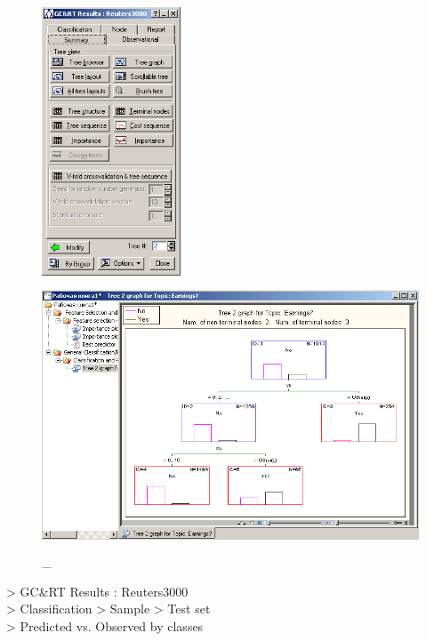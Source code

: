 \begin{figure}[!h]
  \centering

  \begin{minipage}{0.29\textwidth}
    \centering

    \includegraphics[height=8cm]
    {inc/31.PNG}

    \caption{\_}

    \label{fig:31}
  \end{minipage}
  \begin{minipage}{0.69\textwidth}
    \centering

    \includegraphics[height=8cm]
    {inc/32.PNG}

    \caption{\_}

    \label{fig:32}
  \end{minipage}
\end{figure}

> GC\&RT Results : Reuters3000 \\
> Classification > Sample > Test set \\
> Predicted vs. Observed by classes \\

